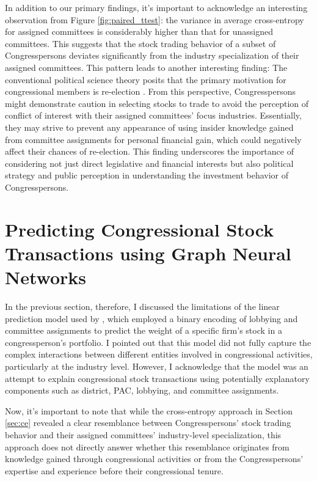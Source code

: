 \documentclass[15pt,letterpaper]{article}
\begin{document}
In addition to our primary findings, it's important to acknowledge an interesting observation from Figure \ref{fig:paired_ttest}: the variance in average cross-entropy for assigned committees is considerably higher than that for unassigned committees. This suggests that the stock trading behavior of a subset of Congresspersons deviates significantly from the industry specialization of their assigned committees. 
This pattern leads to another interesting finding: The conventional political science theory posits that the primary motivation for congressional members is re-election \citep{Mayhew1975CongressTE,fenno1977}. From this perspective, Congresspersons might demonstrate caution in selecting stocks to trade to avoid the perception of conflict of interest with their assigned committees' focus industries. Essentially, they may strive to prevent any appearance of using insider knowledge gained from committee assignments for personal financial gain, which could negatively affect their chances of re-election. This finding underscores the importance of considering not just direct legislative and financial interests but also political strategy and public perception in understanding the investment behavior of Congresspersons.




\section{Predicting Congressional Stock Transactions using Graph Neural Networks}\label{sec:gnn}

In the previous section, therefore, I discussed the limitations of the linear prediction model used by \cite{eg14}, which employed a binary encoding of lobbying and committee assignments to predict the weight of a specific firm's stock in a congressperson's portfolio. I pointed out that this model did not fully capture the complex interactions between different entities involved in congressional activities, particularly at the industry level. However, I acknowledge that the model was an attempt to explain congressional stock transactions using potentially explanatory components such as district, PAC, lobbying, and committee assignments.

Now, it's important to note that while the cross-entropy approach in Section \ref{sec:ce} revealed a clear resemblance between Congresspersons' stock trading behavior and their assigned committees' industry-level specialization, this approach does not directly answer whether this resemblance originates from knowledge gained through congressional activities or from the Congresspersons' expertise and experience before their congressional tenure. 
\end{document}
